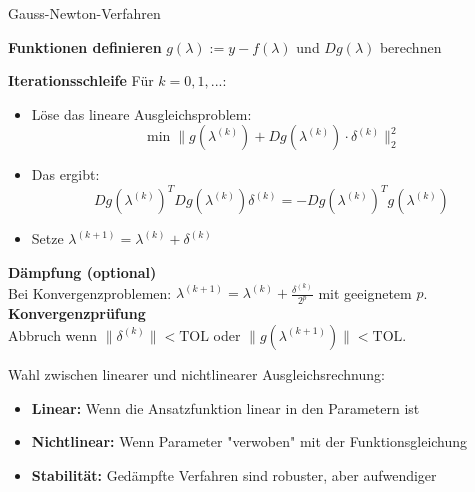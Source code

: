 \begin{KR}{Gauss-Newton-Verfahren}

\textbf{Funktionen definieren}
$g(\lambda) := y - f(\lambda)$ und $Dg(\lambda)$ berechnen

\textbf{Iterationsschleife}
Für $k = 0, 1, ...$:
\begin{itemize}
    \item Löse das lineare Ausgleichsproblem: $$\min \|g(\lambda^{(k)}) + Dg(\lambda^{(k)}) \cdot \delta^{(k)}\|_2^2$$
    \item Das ergibt: $$Dg(\lambda^{(k)})^T Dg(\lambda^{(k)}) \delta^{(k)} = -Dg(\lambda^{(k)})^T g(\lambda^{(k)})$$
    \item Setze $\lambda^{(k+1)} = \lambda^{(k)} + \delta^{(k)}$
\end{itemize}
\vspace{2mm}
\textbf{Dämpfung (optional)}\\
Bei Konvergenzproblemen: $\lambda^{(k+1)} = \lambda^{(k)} + \frac{\delta^{(k)}}{2^p}$ mit geeignetem $p$.
\vspace{2mm}\\
\textbf{Konvergenzprüfung}\\
Abbruch wenn $\|\delta^{(k)}\| < \text{TOL}$ oder $\|g(\lambda^{(k+1)})\| < \text{TOL}$.
\end{KR}

\begin{theorem}{Wahl zwischen linearer und nichtlinearer Ausgleichsrechnung:}
\begin{itemize}
    \item \textbf{Linear:} Wenn die Ansatzfunktion linear in den Parametern ist
    \item \textbf{Nichtlinear:} Wenn Parameter "verwoben" mit der Funktionsgleichung
    \item \textbf{Stabilität:} Gedämpfte Verfahren sind robuster, aber aufwendiger
\end{itemize}
\end{theorem}

